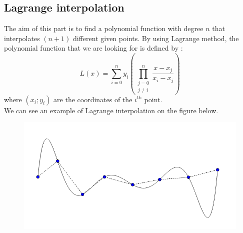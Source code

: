 \documentclass{article}
\begin{document}
\subsection*{Lagrange interpolation}
The aim of this part is to find a polynomial function with degree $n$ that interpolates $(n+1)$ 
different given points. By using Lagrange method, the polynomial function that we are looking for is defined by :
\[ 
	L(x) = \sum_{i=0}^{n}y_i \left(\prod_{\substack{j=0 \\ j\ne i}}^{n}\frac{x-x_j}{x_i-x_j}\right)
\]
where $(x_i;y_i)$ are the coordinates of the $i^{\text{th}}$ point.\\
We can see an example of Lagrange interpolation on the figure below. 
\begin{figure}[H]
	\center
   \includegraphics[scale = 0.35]{Pictures/lag1.png}
\end{figure}
\end{document}
